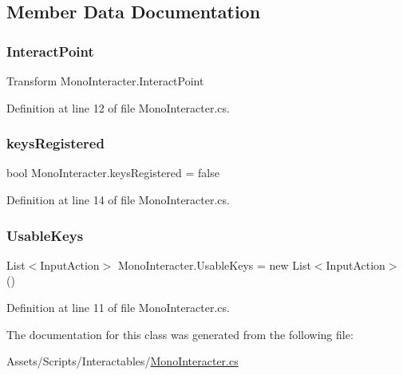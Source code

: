 \subsection{Member Data Documentation}
\mbox{\label{class_mono_interacter_a311fa1a8d88a508851977760b6db955e}} 
\subsubsection{\texorpdfstring{Interact\+Point}{InteractPoint}}
{\footnotesize\ttfamily Transform Mono\+Interacter.\+Interact\+Point}



Definition at line 12 of file Mono\+Interacter.\+cs.

\mbox{\label{class_mono_interacter_afe9a65dfabee6f8d8e1fa56eb503fa38}} 
\subsubsection{\texorpdfstring{keys\+Registered}{keysRegistered}}
{\footnotesize\ttfamily bool Mono\+Interacter.\+keys\+Registered = false\hspace{0.3cm}{\ttfamily [protected]}}



Definition at line 14 of file Mono\+Interacter.\+cs.

\mbox{\label{class_mono_interacter_a29fdba9686647d0a6c83244a8c17973a}} 
\subsubsection{\texorpdfstring{Usable\+Keys}{UsableKeys}}
{\footnotesize\ttfamily List$<$Input\+Action$>$ Mono\+Interacter.\+Usable\+Keys = new List$<$Input\+Action$>$()}



Definition at line 11 of file Mono\+Interacter.\+cs.



The documentation for this class was generated from the following file\+:\begin{DoxyCompactItemize}
\item 
Assets/\+Scripts/\+Interactables/\mbox{\hyperlink{_mono_interacter_8cs}{Mono\+Interacter.\+cs}}\end{DoxyCompactItemize}
